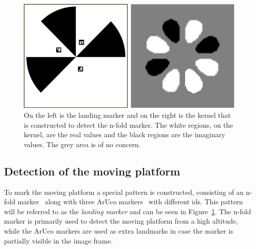 \documentclass[conference]{IEEEtran}
\begin{document}
\begin{figure}
\centering
\includegraphics[scale=0.25]{n-fold-for-landing2.png}
\caption{On the left is the landing marker and on the right is the kernel that is constructed to detect the n-fold marker. The white regions, on the kernel, are the real values and the black regions are the imaginary values. The grey area is of no concern.}
\label{fig:LandingMarker}
\end{figure}

\subsection{Detection of the moving platform}
\label{sec:Detection}

To mark the moving platform a special pattern is constructed,
consisting of an n-fold marker~\cite{NfoldMarker} along with three
ArUco markers~\cite{ArUco_marker} with different ids. This pattern
will be referred to as the \emph{landing marker} and can be seen in
Figure~\ref{fig:LandingMarker}. The n-fold marker is primarily used to
detect the moving platform from a high altitude, while the ArUco
markers are used as extra landmarks in case the marker is partially
visible in the image frame.


\end{document}
